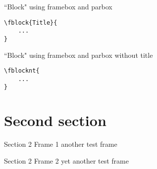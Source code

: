 \begin{frame}[fragile]{``Block" using framebox and parbox}
    \begin{verbatim}
\fblock{Title}{
    ...
}
    \end{verbatim}
	
\end{frame}


\begin{frame}[fragile]{``Block" using framebox and parbox without title}
    \begin{verbatim}
\fblocknt{
    ...
}
    \end{verbatim}

    \end{frame}


\section{Second section}


\begin{frame}{Section 2 Frame 1}
    another test frame
\end{frame}


\begin{frame}{Section 2 Frame 2}
    yet another test frame
\end{frame}
